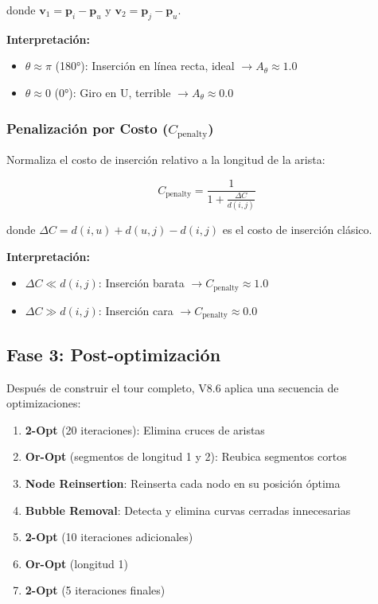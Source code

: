 \documentclass[12pt, a4paper]{article}
\begin{document}
donde $\mathbf{v}_1 = \mathbf{p}_i - \mathbf{p}_u$ y $\mathbf{v}_2 = \mathbf{p}_j - \mathbf{p}_u$.

\textbf{Interpretación:}
\begin{itemize}
    \item $\theta \approx \pi$ (180°): Inserción en línea recta, ideal $\rightarrow A_\theta \approx 1.0$
    \item $\theta \approx 0$ (0°): Giro en U, terrible $\rightarrow A_\theta \approx 0.0$
\end{itemize}

\subsubsection{Penalización por Costo ($C_{\text{penalty}}$)}

Normaliza el costo de inserción relativo a la longitud de la arista:

\begin{equation}
C_{\text{penalty}} = \frac{1}{1 + \frac{\Delta C}{d(i,j)}}
\end{equation}

donde $\Delta C = d(i,u) + d(u,j) - d(i,j)$ es el costo de inserción clásico.

\textbf{Interpretación:}
\begin{itemize}
    \item $\Delta C \ll d(i,j)$: Inserción barata $\rightarrow C_{\text{penalty}} \approx 1.0$
    \item $\Delta C \gg d(i,j)$: Inserción cara $\rightarrow C_{\text{penalty}} \approx 0.0$
\end{itemize}

\subsection{Fase 3: Post-optimización}

Después de construir el tour completo, V8.6 aplica una secuencia de optimizaciones:

\begin{enumerate}
    \item \textbf{2-Opt} (20 iteraciones): Elimina cruces de aristas
    \item \textbf{Or-Opt} (segmentos de longitud 1 y 2): Reubica segmentos cortos
    \item \textbf{Node Reinsertion}: Reinserta cada nodo en su posición óptima
    \item \textbf{Bubble Removal}: Detecta y elimina curvas cerradas innecesarias
    \item \textbf{2-Opt} (10 iteraciones adicionales)
    \item \textbf{Or-Opt} (longitud 1)
    \item \textbf{2-Opt} (5 iteraciones finales)
\end{enumerate}
\end{document}
